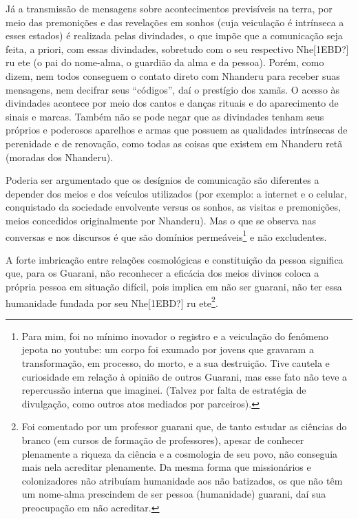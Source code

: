 \documentclass{article}
\begin{document}
J\'a a transmiss\~ao de mensagens sobre acontecimentos previs\'iveis na
terra, por meio das premoni\c{c}\~oes e das revela\c{c}\~oes em sonhos
(cuja veicula\c{c}\~ao \'e intr\'inseca a esses estados) \'e realizada
pelas divindades, o que imp\~oe que a comunica\c{c}\~ao seja feita, a
priori, com essas divindades, sobretudo com o seu respectivo Nhe[1EBD?]
ru ete (o pai do nome-alma, o guardi\~ao da alma e da pessoa). Por\'em,
como dizem, nem todos conseguem o contato direto com Nhanderu para
receber suas mensagens, nem decifrar seus
{\textquotedblleft}c\'odigos{\textquotedblright}, da\'i o prest\'igio
dos xam\~as. O acesso \`as divindades acontece por meio dos cantos e
dan\c{c}as rituais e do aparecimento de sinais e marcas. Tamb\'em n\~ao
se pode negar que as divindades tenham seus pr\'oprios e poderosos
aparelhos e armas que possuem as qualidades intr\'insecas de perenidade
e de renova\c{c}\~ao, como todas as coisas que existem em Nhanderu
ret\~a (moradas dos Nhanderu). 

Poderia ser argumentado que os des\'ignios de comunica\c{c}\~ao s\~ao
diferentes a depender dos meios e dos ve\'iculos utilizados (por
exemplo: a internet e o celular, conquistado da sociedade envolvente
versus os sonhos, as visitas e premoni\c{c}\~oes, meios concedidos
originalmente por Nhanderu). Mas o que se observa nas conversas e nos
discursos \'e que s\~ao dom\'inios perme\'aveis\footnote{ Para mim, foi
no m\'inimo inovador o registro e a veicula\c{c}\~ao do fen\^omeno 
jepota no youtube: um corpo foi exumado por jovens que gravaram a
transforma\c{c}\~ao, em processo, do morto, e a sua destrui\c{c}\~ao.
Tive cautela e curiosidade em rela\c{c}\~ao \`a opini\~ao de outros
Guarani, mas esse fato n\~ao teve a repercuss\~ao interna que imaginei.
(Talvez por falta de estrat\'egia de divulga\c{c}\~ao, como outros atos
mediados por parceiros).} e n\~ao excludentes.

A forte imbrica\c{c}\~ao entre rela\c{c}\~oes cosmol\'ogicas e
constitui\c{c}\~ao da pessoa significa que, para os Guarani, n\~ao
reconhecer a efic\'acia dos meios divinos coloca a pr\'opria pessoa em
situa\c{c}\~ao dif\'icil, pois implica em n\~ao ser guarani, n\~ao ter
essa humanidade fundada por seu  Nhe[1EBD?] ru ete\footnote{ Foi
comentado por um professor guarani que, de tanto estudar as ci\^encias
do branco (em cursos de forma\c{c}\~ao de professores), apesar de
conhecer plenamente a riqueza da ci\^encia e a cosmologia de seu povo,
n\~ao conseguia mais nela acreditar plenamente. Da mesma forma que
mission\'arios e colonizadores n\~ao atribu\'iam humanidade aos n\~ao
batizados, os que n\~ao t\^em um nome-alma prescindem de ser pessoa
(humanidade) guarani, da\'i sua preocupa\c{c}\~ao em n\~ao acreditar.}.
 
\end{document}
